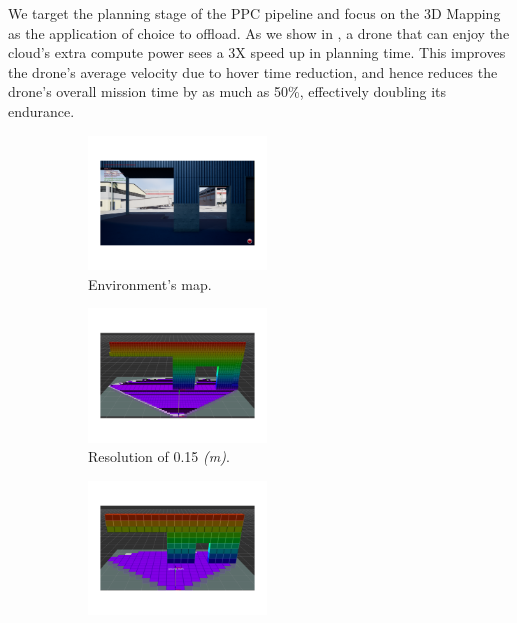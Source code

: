 We target the planning stage of the PPC pipeline and focus on the 3D Mapping as the application of choice to offload. As we show in , a drone that can enjoy the cloud's extra compute power sees a 3X speed up in planning time. This improves the drone's average velocity due to hover time reduction, and hence reduces the drone's overall mission time by as much as 50\%, effectively doubling its endurance.

\begin{figure}[!t]
\vspace{-12pt}
    \centering
    \begin{subfigure}[t]{.24\linewidth}
        \centering
        \includegraphics[height=1.4in]{figs/garage_sim}%
         \vspace{-20pt}
        \caption{Environment's map.}%
        \label{fig:garage_sim}
    \end{subfigure}
    \hfill
    \begin{subfigure}[t]{.24\linewidth}
        \centering
        \includegraphics[height=1.4in]{figs/garage_rviz__15}%
         \vspace{-20pt}
        \caption{Resolution of 0.15 \emph{(m)}.}%
        \label{fig:rviz__15}
    \end{subfigure}
    \hfill
     \begin{subfigure}[t]{.24\linewidth}
        \centering
        \includegraphics[height=1.4in]{figs/garage_rviz__5}%

\end{subfigure}
\end{figure}

